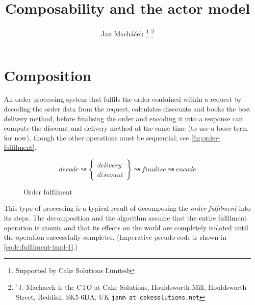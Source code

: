 



\title{Composability and the actor model}

\author{Jan Mach{\'a}\v{c}ek%
\thanks{Supported by Cake Solutions Limited}%
\thanks{$^{1}$J. Machacek is the CTO at Cake Solutions, Houldsworth Mill, Houldsworth Street, Reddish, SK5 6DA, UK {\tt\small janm at cakesolutions.net}}%
}



\twocolumn[
  \begin{@twocolumnfalse}
    \maketitle
    \begin{abstract}
      
    \end{abstract}
  \end{@twocolumnfalse}
]

\section{Composition}
An order processing system that fulfils the order contained within a request by decoding the order data from the request, calculates discounts and books the best delivery method, before finalising the order and encoding it into a response can compute the discount and delivery method at the same time (to use a loose term for now), though the other operations must be sequential; see \autoref{fig:order-fulfilment}.

\begin{figure}[h]
  \DontPrintSemicolon
  
  \[ 
    decode \rightwavearrow
    \left \{\begin{array}{l}
      delivery \\ discount
      \end{array}
    \right \} \rightwavearrow finalise \rightwavearrow encode
  \]
  \caption{Order fulfilment}
  \label{fig:order-fulfilment}
\end{figure} 

This type of processing is a typical result of decomposing the \emph{order fulfilment} into its steps. The decomposition and the algorithm assume that the entire fulfilment operation is atomic and that its effects on the world are completely isolated until the  operation successfully completes. (Imperative pseudo-code is shown in \autoref{code:fulfilment-impl-1}.)

